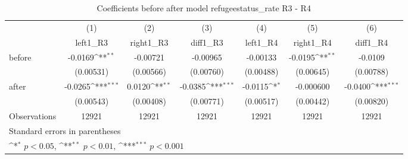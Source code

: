 \begin{table}[!ht]\centering \footnotesize
\def\sym#1{\ifmmode^{#1}\else\(^{#1}\)\fi}
\caption{Coefficients before after model refugeestatus\_rate R3 - R4}
\begin{tabular}{l*{6}{c}}
\hline\hline
                    &\multicolumn{1}{c}{(1)}&\multicolumn{1}{c}{(2)}&\multicolumn{1}{c}{(3)}&\multicolumn{1}{c}{(4)}&\multicolumn{1}{c}{(5)}&\multicolumn{1}{c}{(6)}\\
                    &\multicolumn{1}{c}{left1\_R3}&\multicolumn{1}{c}{right1\_R3}&\multicolumn{1}{c}{diff1\_R3}&\multicolumn{1}{c}{left1\_R4}&\multicolumn{1}{c}{right1\_R4}&\multicolumn{1}{c}{diff1\_R4}\\
\hline
before              &     -0.0169\sym{**} &    -0.00721         &    -0.00965         &    -0.00133         &     -0.0195\sym{**} &     -0.0109         \\
                    &   (0.00531)         &   (0.00566)         &   (0.00760)         &   (0.00488)         &   (0.00645)         &   (0.00788)         \\
[1em]
after               &     -0.0265\sym{***}&      0.0120\sym{**} &     -0.0385\sym{***}&     -0.0115\sym{*}  &   -0.000600         &     -0.0400\sym{***}\\
                    &   (0.00543)         &   (0.00408)         &   (0.00771)         &   (0.00517)         &   (0.00442)         &   (0.00820)         \\
\hline
Observations        &       12921         &       12921         &       12921         &       12921         &       12921         &       12921         \\
\hline\hline
\multicolumn{7}{l}{\footnotesize Standard errors in parentheses}\\
\multicolumn{7}{l}{\footnotesize \sym{*} \(p<0.05\), \sym{**} \(p<0.01\), \sym{***} \(p<0.001\)}\\
\end{tabular}
\end{table}
